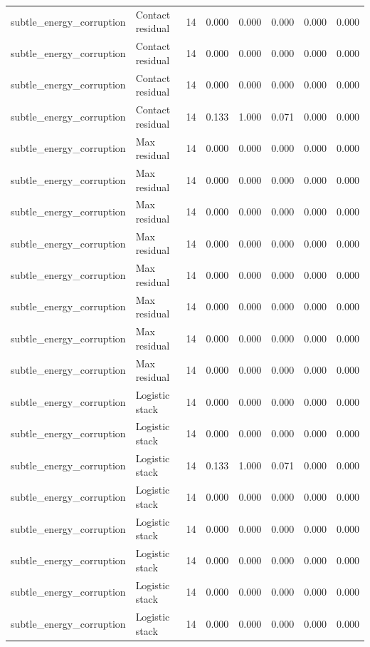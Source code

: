 {\begin{longtable}{llrrrrrr}
subtle\_energy\_corruption & Contact residual & 14 & 0.000 & 0.000 & 0.000 & 0.000 & 0.000 \\
subtle\_energy\_corruption & Contact residual & 14 & 0.000 & 0.000 & 0.000 & 0.000 & 0.000 \\
subtle\_energy\_corruption & Contact residual & 14 & 0.000 & 0.000 & 0.000 & 0.000 & 0.000 \\
subtle\_energy\_corruption & Contact residual & 14 & 0.133 & 1.000 & 0.071 & 0.000 & 0.000 \\
subtle\_energy\_corruption & Max residual & 14 & 0.000 & 0.000 & 0.000 & 0.000 & 0.000 \\
subtle\_energy\_corruption & Max residual & 14 & 0.000 & 0.000 & 0.000 & 0.000 & 0.000 \\
subtle\_energy\_corruption & Max residual & 14 & 0.000 & 0.000 & 0.000 & 0.000 & 0.000 \\
subtle\_energy\_corruption & Max residual & 14 & 0.000 & 0.000 & 0.000 & 0.000 & 0.000 \\
subtle\_energy\_corruption & Max residual & 14 & 0.000 & 0.000 & 0.000 & 0.000 & 0.000 \\
subtle\_energy\_corruption & Max residual & 14 & 0.000 & 0.000 & 0.000 & 0.000 & 0.000 \\
subtle\_energy\_corruption & Max residual & 14 & 0.000 & 0.000 & 0.000 & 0.000 & 0.000 \\
subtle\_energy\_corruption & Max residual & 14 & 0.000 & 0.000 & 0.000 & 0.000 & 0.000 \\
subtle\_energy\_corruption & Logistic stack & 14 & 0.000 & 0.000 & 0.000 & 0.000 & 0.000 \\
subtle\_energy\_corruption & Logistic stack & 14 & 0.000 & 0.000 & 0.000 & 0.000 & 0.000 \\
subtle\_energy\_corruption & Logistic stack & 14 & 0.133 & 1.000 & 0.071 & 0.000 & 0.000 \\
subtle\_energy\_corruption & Logistic stack & 14 & 0.000 & 0.000 & 0.000 & 0.000 & 0.000 \\
subtle\_energy\_corruption & Logistic stack & 14 & 0.000 & 0.000 & 0.000 & 0.000 & 0.000 \\
subtle\_energy\_corruption & Logistic stack & 14 & 0.000 & 0.000 & 0.000 & 0.000 & 0.000 \\
subtle\_energy\_corruption & Logistic stack & 14 & 0.000 & 0.000 & 0.000 & 0.000 & 0.000 \\
subtle\_energy\_corruption & Logistic stack & 14 & 0.000 & 0.000 & 0.000 & 0.000 & 0.000 \\

\end{longtable}}
